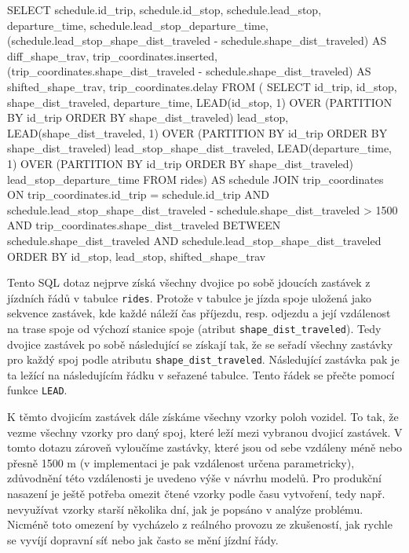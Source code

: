 \begin{code}[frame=none]
SELECT schedule.id_trip,
  schedule.id_stop,
  schedule.lead_stop,
  departure_time,
  schedule.lead_stop_departure_time,
  (schedule.lead_stop_shape_dist_traveled - schedule.shape_dist_traveled)
    AS diff_shape_trav,
  trip_coordinates.inserted,
  (trip_coordinates.shape_dist_traveled - schedule.shape_dist_traveled)
    AS shifted_shape_trav,
  trip_coordinates.delay
FROM (
  SELECT id_trip, id_stop, shape_dist_traveled, departure_time,
    LEAD(id_stop, 1) OVER (PARTITION BY
	  id_trip ORDER BY shape_dist_traveled) lead_stop,
    LEAD(shape_dist_traveled, 1) OVER (PARTITION BY
	  id_trip ORDER BY shape_dist_traveled) lead_stop_shape_dist_traveled,
    LEAD(departure_time, 1) OVER (PARTITION BY
	  id_trip ORDER BY shape_dist_traveled) lead_stop_departure_time
  FROM rides) AS schedule
JOIN trip_coordinates
ON trip_coordinates.id_trip = schedule.id_trip AND
  schedule.lead_stop_shape_dist_traveled -
    schedule.shape_dist_traveled > 1500 AND
  trip_coordinates.shape_dist_traveled
    BETWEEN schedule.shape_dist_traveled AND
  schedule.lead_stop_shape_dist_traveled
ORDER BY id_stop, lead_stop, shifted_shape_trav
\end{code}


Tento SQL dotaz nejprve získá všechny dvojice po sobě jdoucích zastávek z jízdních řádů v tabulce \verb-rides-. Protože v tabulce je jízda spoje uložená jako sekvence zastávek, kde každé náleží čas příjezdu, resp. odjezdu a její vzdálenost na trase spoje od výchozí stanice spoje (atribut \verb-shape_dist_traveled-). Tedy dvojice zastávek po sobě následující se získají tak, že se seřadí všechny zastávky pro každý spoj podle atributu \verb-shape_dist_traveled-. Následující zastávka pak je ta ležící na následujícím řádku v seřazené tabulce. Tento řádek se přečte pomocí funkce \verb-LEAD-.


\bigbreak


K těmto dvojicím zastávek dále získáme všechny vzorky poloh vozidel. To tak, že vezme všechny vzorky pro daný spoj, které leží mezi vybranou dvojicí zastávek. V tomto dotazu zároveň vyloučíme zastávky, které jsou od sebe vzdáleny méně nebo přesně 1500 m (v implementaci je pak vzdálenost určena parametricky), zdůvodnění této vzdálenosti je uvedeno výše v návrhu modelů. Pro produkční nasazení je ještě potřeba omezit čtené vzorky podle času vytvoření, tedy např. nevyužívat vzorky starší několika dní, jak je popsáno v analýze problému. Nicméně toto omezení by vycházelo z reálného provozu ze zkušeností, jak rychle se vyvíjí dopravní síť nebo jak často se mění jízdní řády.


